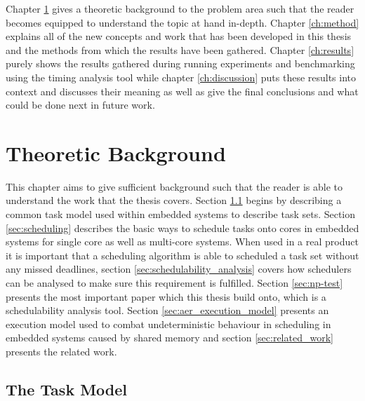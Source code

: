 \documentclass{kththesis}
\begin{document}
Chapter \ref{ch:theoretic_background} gives a theoretic background to the problem area such that the
reader becomes equipped to understand the topic at hand in-depth. Chapter \ref{ch:method} explains
all of the new concepts and work that has been developed in this thesis and the methods from which
the results have been gathered. Chapter \ref{ch:results} purely shows the results gathered during
running experiments and benchmarking using the timing analysis tool while chapter \ref{ch:discussion}
puts these results into context and discusses their meaning as well as give the final conclusions and
what could be done next in future work.


\chapter{Theoretic Background}\label{ch:theoretic_background}

This chapter aims to give sufficient background such that the reader is able to understand the work
that the thesis covers. Section \ref{sec:the_task_model} begins by describing a common task model
used within embedded systems to describe task sets. Section \ref{sec:scheduling} describes the basic
ways to schedule tasks onto cores in embedded systems for single core as well as multi-core systems.
When used in a real product it is important that a scheduling algorithm is able to scheduled a task
set without any missed deadlines, section \ref{sec:schedulability_analysis} covers how schedulers
can be analysed to make sure this requirement is fulfilled. Section \ref{sec:np-test} presents the
most important paper which this thesis build onto, which is a schedulability analysis tool. Section
\ref{sec:aer_execution_model} presents an execution model used to combat undeterministic behaviour
in scheduling in embedded systems caused by shared memory and section \ref{sec:related_work}
presents the related work.


\section{The Task Model} \label{sec:the_task_model}
\end{document}
